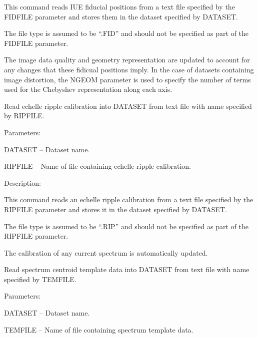 \begin {description}
\begin {description}
This command reads IUE fiducial positions from a text file
specified by the FIDFILE parameter and stores them in the dataset
specified by DATASET.

The file type is assumed to be ``.FID'' and should not be specified
as part of the FIDFILE parameter.

The image data quality and geometry representation are updated to
account for any changes that these fidicual positions imply.
In the case of datasets containing image distortion, the NGEOM
parameter is used to specify the number of terms used for the Chebyshev 
representation along each axis.
\end {description}

\item [NEWRIP]
Read echelle ripple calibration into DATASET from text file 
with name specified by RIPFILE.

\begin {description}
\item Parameters:

\begin {description}
\item DATASET -- Dataset name.
\item RIPFILE -- Name of file containing echelle ripple calibration.
\end {description}

\item Description:

This command reads an echelle ripple calibration from a text file
specified by the RIPFILE parameter and stores it in the dataset
specified by DATASET.

The file type is assumed to be ``.RIP'' and should not be specified 
as part of the RIPFILE parameter.

The calibration of any current spectrum is automatically updated.
\end {description}

\item [NEWTEM]
Read spectrum centroid template data into DATASET from text 
file with name specified by TEMFILE.

\begin {description}
\item Parameters:

\begin {description}
\item DATASET -- Dataset name.
\item TEMFILE -- Name of file containing spectrum template data.
\end {description}


\end{description}
\end{description}
